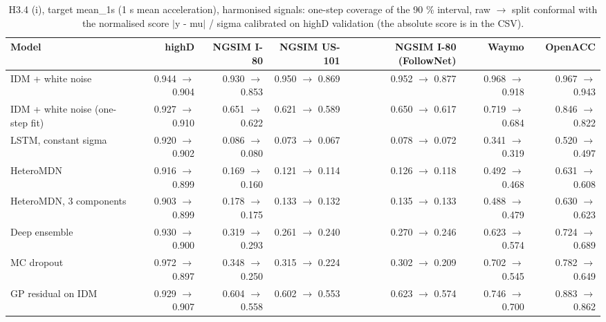 \begin{table}[htbp]
\centering
\footnotesize
\caption{H3.4 (i), target mean\_1s (1 s mean acceleration), harmonised signals: one-step coverage of the 90 \% interval, raw $\rightarrow$ split conformal with the normalised score $|$y - mu$|$ / sigma calibrated on highD validation (the absolute score is in the CSV).}
\label{tab:t4-onestep-conformal--harmonised--mean-1s}
\begin{tabular}{lrrrrrr}
\toprule
Model & highD & NGSIM I-80 & NGSIM US-101 & NGSIM I-80 (FollowNet) & Waymo & OpenACC \\
\midrule
IDM + white noise & 0.944 $\rightarrow$ 0.904 & 0.930 $\rightarrow$ 0.853 & 0.950 $\rightarrow$ 0.869 & 0.952 $\rightarrow$ 0.877 & 0.968 $\rightarrow$ 0.918 & 0.967 $\rightarrow$ 0.943 \\
IDM + white noise (one-step fit) & 0.927 $\rightarrow$ 0.910 & 0.651 $\rightarrow$ 0.622 & 0.621 $\rightarrow$ 0.589 & 0.650 $\rightarrow$ 0.617 & 0.719 $\rightarrow$ 0.684 & 0.846 $\rightarrow$ 0.822 \\
LSTM, constant sigma & 0.920 $\rightarrow$ 0.902 & 0.086 $\rightarrow$ 0.080 & 0.073 $\rightarrow$ 0.067 & 0.078 $\rightarrow$ 0.072 & 0.341 $\rightarrow$ 0.319 & 0.520 $\rightarrow$ 0.497 \\
HeteroMDN & 0.916 $\rightarrow$ 0.899 & 0.169 $\rightarrow$ 0.160 & 0.121 $\rightarrow$ 0.114 & 0.126 $\rightarrow$ 0.118 & 0.492 $\rightarrow$ 0.468 & 0.631 $\rightarrow$ 0.608 \\
HeteroMDN, 3 components & 0.903 $\rightarrow$ 0.899 & 0.178 $\rightarrow$ 0.175 & 0.133 $\rightarrow$ 0.132 & 0.135 $\rightarrow$ 0.133 & 0.488 $\rightarrow$ 0.479 & 0.630 $\rightarrow$ 0.623 \\
Deep ensemble & 0.930 $\rightarrow$ 0.900 & 0.319 $\rightarrow$ 0.293 & 0.261 $\rightarrow$ 0.240 & 0.270 $\rightarrow$ 0.246 & 0.623 $\rightarrow$ 0.574 & 0.724 $\rightarrow$ 0.689 \\
MC dropout & 0.972 $\rightarrow$ 0.897 & 0.348 $\rightarrow$ 0.250 & 0.315 $\rightarrow$ 0.224 & 0.302 $\rightarrow$ 0.209 & 0.702 $\rightarrow$ 0.545 & 0.782 $\rightarrow$ 0.649 \\
GP residual on IDM & 0.929 $\rightarrow$ 0.907 & 0.604 $\rightarrow$ 0.558 & 0.602 $\rightarrow$ 0.553 & 0.623 $\rightarrow$ 0.574 & 0.746 $\rightarrow$ 0.700 & 0.883 $\rightarrow$ 0.862 \\

\end{tabular}
\end{table}
